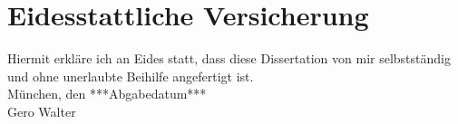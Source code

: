 

\chapter*{Eidesstattliche Versicherung}

Hiermit erkläre ich an Eides statt, dass diese Dissertation von mir
selbstständig und ohne unerlaubte Beihilfe angefertigt ist.\\[3ex]

München, den ***Abgabedatum***\\[2ex]
\hspace*{0.5\textwidth} {\small Gero Walter}


